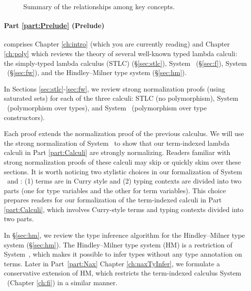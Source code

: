 \begin{figure}

\caption{Summary of the relationships among key concepts.}
\label{fig:overview}
\end{figure}


\paragraph{Part \ref{part:Prelude} (Prelude)}\hspace{-1em} 
comprises Chapter \ref{ch:intro} (which you are currently reading)
and Chapter \ref{ch:poly} which 
reviews the theory of several well-known typed lambda calculi:
the simply-typed lambda calculus (STLC) (\S\ref{sec:stlc}),
System \F\ (\S\ref{sec:f}),
System \Fw\ (\S\ref{sec:fw}), and
the Hindley--Milner type system (\S\ref{sec:hm}).

In Sections \ref{sec:stlc}-\ref{sec:fw}, we review strong normalization proofs
(using saturated sets) for each of the three calculi:
STLC (no polymorphism), System \F\ (polymorphism over types), and
System \Fw\ (polymorphism over type constructors).

Each proof extends the normalization proof of the previous calculus.
We will use the strong normalization of System \Fw\ to show that
our term-indexed lambda calculi in Part \ref{part:Calculi} are
strongly normalizing. Readers familiar with strong normalization proofs
of these calculi may skip or quickly skim over these sections.
It is worth noticing two stylistic choices in our formalization of
System \F\ and \Fw: (1) terms are in Curry style and
(2) typing contexts are divided into two parts
    (one for type variables and the other for term variables).
This choice prepares readers for our formalization of the term-indexed calculi
in Part \ref{part:Calculi}, which involves Curry-style terms and
typing contexts divided into two parts.

In \S\ref{sec:hm}, we review the type inference algorithm for
the Hindley--Milner type system (\S\ref{sec:hm}).
The Hindley--Milner type system (HM) is a restriction of System~\F,
which makes it possible to infer types without any type annotation on terms.
Later in Part~\ref{part:Nax} Chapter \ref{ch:naxTyInfer},
we formulate a conservative extension of HM, which restricts
the term-indexed calculus System \Fi\ (Chapter \ref{ch:fi}) in a similar manner.


